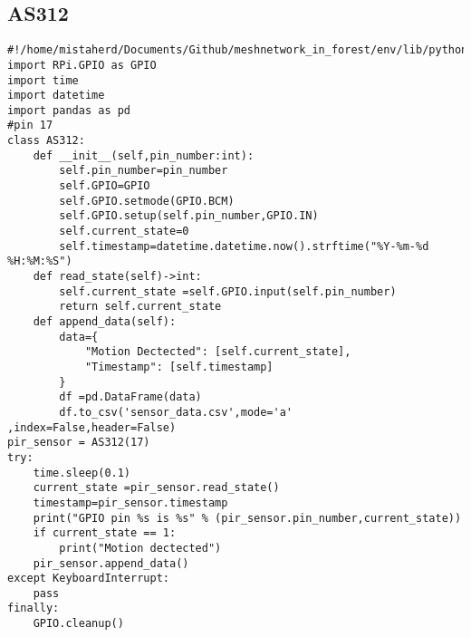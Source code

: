 \subsection{AS312}
\begin{lstlisting}[style=mystyle,caption={code for  AS312}]
#!/home/mistaherd/Documents/Github/meshnetwork_in_forest/env/lib/python3.11
import RPi.GPIO as GPIO
import time
import datetime
import pandas as pd
#pin 17
class AS312:
	def __init__(self,pin_number:int):
		self.pin_number=pin_number
		self.GPIO=GPIO
		self.GPIO.setmode(GPIO.BCM)
		self.GPIO.setup(self.pin_number,GPIO.IN)
		self.current_state=0
		self.timestamp=datetime.datetime.now().strftime("%Y-%m-%d %H:%M:%S")
	def read_state(self)->int:
		self.current_state =self.GPIO.input(self.pin_number)
		return self.current_state
	def append_data(self):
		data={
			"Motion Dectected": [self.current_state],
			"Timestamp": [self.timestamp]
		}
		df =pd.DataFrame(data)
		df.to_csv('sensor_data.csv',mode='a' ,index=False,header=False)
pir_sensor = AS312(17)
try:
	time.sleep(0.1)
	current_state =pir_sensor.read_state()
	timestamp=pir_sensor.timestamp
	print("GPIO pin %s is %s" % (pir_sensor.pin_number,current_state))
	if current_state == 1:
		print("Motion dectected")
	pir_sensor.append_data()
except KeyboardInterrupt:
	pass
finally:
	GPIO.cleanup()
\end{lstlisting}